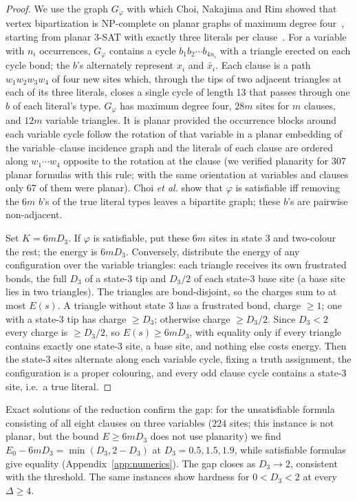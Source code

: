 \documentclass[aps,pre,twocolumn,floatfix,10pt]{revtex4-2}
\theoremstyle{definition}
\theoremstyle{remark}
\newcommand{\OPT}{E_0}
\begin{document}
\begin{proof}
We use the graph $G_\varphi$ with which Choi, Nakajima and Rim showed that vertex bipartization
is NP-complete on planar graphs of maximum degree four~\cite{Choi1989}, starting from
planar 3-SAT with exactly three literals per clause~\cite{Lichtenstein1982}. For a variable with
$n_i$ occurrences, $G_\varphi$ contains a cycle $b_1b_2\cdots b_{4n_i}$ with a triangle erected on
each cycle bond; the $b$'s alternately represent $x_i$ and $\bar x_i$. Each clause is a path
$w_1w_2w_3w_4$ of four new sites which, through the tips of two adjacent triangles at each of its
three literals, closes a single cycle of length 13 that passes through one $b$ of each literal's
type.
$G_\varphi$ has maximum degree four, $28m$ sites for $m$ clauses, and $12m$ variable
triangles. It is planar provided the occurrence blocks around each variable cycle follow the
rotation of that variable in a planar embedding of the variable--clause incidence graph and the
literals of each clause are ordered along $w_1\cdots w_4$ opposite to the rotation at the clause
(we verified planarity for 307 planar formulas with this rule; with the same orientation at
variables and clauses only 67 of them were planar). Choi \emph{et al.} show that $\varphi$ is satisfiable iff removing the $6m$ $b$'s of the
true literal types leaves a bipartite graph; these $b$'s are pairwise non-adjacent.

Set $K=6mD_3$. If $\varphi$ is satisfiable, put these $6m$ sites in state 3 and two-colour the rest;
the energy is $6mD_3$. Conversely, distribute the energy of any configuration over the variable
triangles: each triangle receives its own frustrated bonds, the full $D_3$ of a state-3 tip and
$D_3/2$ of each state-3 base site (a base site lies in two triangles). The triangles are
bond-disjoint, so the charges sum to at most $E(s)$. A triangle without state 3 has a frustrated
bond, charge $\ge1$; one with a state-3 tip has charge $\ge D_3$; otherwise charge $\ge D_3/2$.
Since $D_3<2$ every charge is $\ge D_3/2$, so $E(s)\ge6mD_3$, with equality only if every triangle
contains exactly one state-3 site, a base site, and nothing else costs energy. Then the state-3
sites alternate along each variable cycle, fixing a truth assignment, the configuration is a
proper colouring, and every odd clause cycle contains a state-3 site, i.e.\ a true literal.
\end{proof}

Exact solutions of the reduction confirm the gap: for the unsatisfiable formula consisting of all
eight clauses on three variables ($224$ sites; this instance is not planar, but the bound
$E\ge6mD_3$ does not use planarity) we find $\OPT-6mD_3=\min(D_3,2-D_3)$ at $D_3=0.5,1.5,1.9$,
while satisfiable formulas give equality (Appendix~\ref{app:numerics}). The gap closes as
$D_3\to2$, consistent with the threshold. The same instances show hardness for $0<D_3<2$ at every
$\Delta\ge4$.
\end{document}
